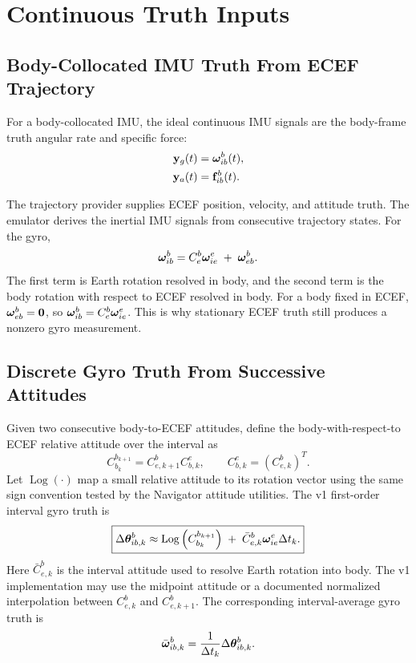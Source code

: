 \chapter{Continuous Truth Inputs}

\section{Body-Collocated IMU Truth From ECEF Trajectory}

For a body-collocated IMU, the ideal continuous IMU signals are the body-frame
truth angular rate and specific force:
\begin{align}
\mathbf{y}_g(t) &= \boldsymbol{\omega}_{ib}^{b}(t),\\
\mathbf{y}_a(t) &= \mathbf{f}_{ib}^{b}(t).
\end{align}

The trajectory provider supplies ECEF position, velocity, and attitude truth.
The emulator derives the inertial IMU signals from consecutive trajectory
states. For the gyro,
\begin{equation}
\boldsymbol{\omega}_{ib}^{b}
=
C_e^b\boldsymbol{\omega}_{ie}^{e}
\;+\;
\boldsymbol{\omega}_{eb}^{b}.
\label{eq:imu_stationary_earth_rate_truth}
\end{equation}
The first term is Earth rotation resolved in body, and the second term is the
body rotation with respect to ECEF resolved in body. For a body fixed in ECEF,
$\boldsymbol{\omega}_{eb}^{b}=\mathbf{0}$, so
$\boldsymbol{\omega}_{ib}^{b}=C_e^b\boldsymbol{\omega}_{ie}^{e}$. This is why stationary ECEF truth
still produces a nonzero gyro measurement.

\section{Discrete Gyro Truth From Successive Attitudes}

Given two consecutive body-to-ECEF attitudes, define the body-with-respect-to
ECEF relative attitude over the interval as
\begin{equation}
C_{b_k}^{b_{k+1}}
=
C_{e,k+1}^{b}C_{b,k}^{e},
\qquad
C_{b,k}^{e}=(C_{e,k}^{b})^T.
\label{eq:imu_body_relative_attitude}
\end{equation}
Let $\operatorname{Log}(\cdot)$ map a small relative attitude to its rotation
vector using the same sign convention tested by the Navigator attitude
utilities. The v1 first-order interval gyro truth is
\begin{equation}
\boxed{
\Delta\boldsymbol{\theta}_{ib,k}^{b}
\approx
\operatorname{Log}
\left(
C_{b_k}^{b_{k+1}}
\right)
\;+\;
\bar{C}_{e,k}^{b}\boldsymbol{\omega}_{ie}^{e}\Delta t_k.
}
\label{eq:imu_delta_theta_from_ecef_truth}
\end{equation}
Here $\bar{C}_{e,k}^{b}$ is the interval attitude used to resolve Earth
rotation into body. The v1 implementation may use the midpoint attitude or a
documented normalized interpolation between $C_{e,k}^{b}$ and
$C_{e,k+1}^{b}$. The corresponding interval-average gyro truth is
\begin{equation}
\bar{\boldsymbol{\omega}}_{ib,k}^{b}
=
\frac{1}{\Delta t_k}
\Delta\boldsymbol{\theta}_{ib,k}^{b}.
\label{eq:imu_average_gyro_from_delta_theta}
\end{equation}

